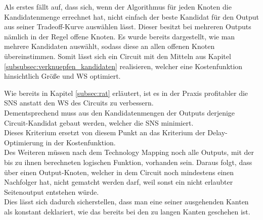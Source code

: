 \documentclass[11pt, a4paper, german]{article}
\newcommand{\TM}{Technology  Mapping }
\begin{document}
Als erstes fällt auf, dass sich, wenn der Algorithmus für jeden Knoten die Kandidatenmenge errechnet hat, nicht einfach der beste Kandidat für den Output aus seiner Tradeoff-Kurve auswählen lässt. Dieser besitzt bei mehreren Outputs nämlich in der Regel offene Knoten. 
Es wurde bereits dargestellt, wie man mehrere Kandidaten auswählt, sodass diese an allen offenen Knoten übereinstimmen. Somit lässt sich ein Circuit mit den Mitteln aus Kapitel \ref{subsubsec:verknuepfen_kandidaten} realisieren, welcher eine Kostenfunktion hinsichtlich Größe und WS optimiert. \\

Wie bereits in Kapitel \ref{subsec:rat}  erläutert, ist es in der Praxis profitabler die SNS anstatt den WS des Circuits zu verbessern.\\
Dementsprechend muss aus den Kandidatenmengen der Outputs derjenige Circuit-Kandidat gebaut werden, welcher die SNS minimiert.\\
Dieses Kriterium ersetzt von diesem Punkt an  das Kriterium der Delay-Optimierung in der Kostenfunktion.\\
 
Des Weiteren müssen nach dem \TM noch alle Outputs, mit der bis zu ihnen berechneten logischen Funktion, vorhanden sein. Daraus folgt, dass über einen Output-Knoten, welcher in dem Circuit noch mindestens einen Nachfolger hat, nicht gematcht werden darf, weil sonst ein nicht erlaubter Seitenoutput entstehen würde.\\
 Dies lässt sich dadurch sicherstellen, dass man eine seiner ausgehenden Kanten als konstant deklariert, wie das bereits bei den zu langen Kanten geschehen ist. 
\end{document}
